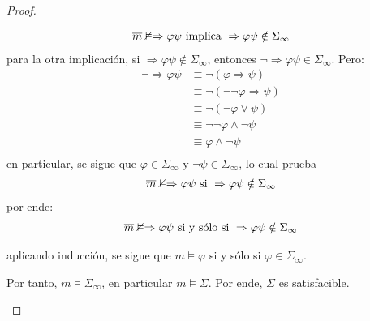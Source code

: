 \documentclass[12pt]{report}
\newcounter{it}
\theoremstyle{largebreak}
\begin{document}
\begin{proof}
\begin{itemize}
\begin{itemize}
                \begin{equation*}
                    \begin{split}
                        \overline{m}\nvDash\Rightarrow\varphi\psi&\textup{ implica }\Rightarrow\varphi\psi\notin\Sigma_{\infty}\\
                    \end{split}
                \end{equation*}
                para la otra implicación, si $\Rightarrow\varphi\psi\notin\Sigma_{\infty}$, entonces $\neg\Rightarrow\varphi\psi\in\Sigma_\infty$. Pero:
                \begin{equation*}
                    \begin{split}
                        \neg\Rightarrow\varphi\psi&\equiv\neg(\varphi\Rightarrow\psi)\\
                        &\equiv\neg(\neg\neg\varphi\Rightarrow\psi)\\
                        &\equiv\neg(\neg\varphi\lor\psi)\\
                        &\equiv\neg\neg\varphi\land\neg\psi\\
                        &\equiv\varphi\land\neg\psi\\
                    \end{split}
                \end{equation*}
                en particular, se sigue que $\varphi\in\Sigma_{\infty}$ y $\neg\psi\in\Sigma_{\infty}$, lo cual prueba
                \begin{equation*}
                    \begin{split}
                        \overline{m}\nvDash\Rightarrow\varphi\psi&\textup{ si }\Rightarrow\varphi\psi\notin\Sigma_{\infty}\\
                    \end{split}
                \end{equation*}
                por ende:
                \begin{equation*}
                    \begin{split}
                        \overline{m}\nvDash\Rightarrow\varphi\psi&\textup{ si y sólo si }\Rightarrow\varphi\psi\notin\Sigma_{\infty}\\
                    \end{split}
                \end{equation*}
            \end{itemize}
            aplicando inducción, se sigue que $m\vDash\varphi$ si y sólo si $\varphi\in\Sigma_{\infty}$.

            Por tanto, $m\vDash\Sigma_{\infty}$, en particular $m\vDash\Sigma$. Por ende, $\Sigma$ es satisfacible.
        \end{itemize}
    \end{proof}
\end{document}
